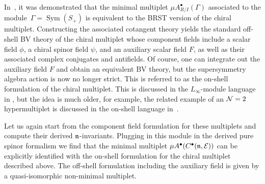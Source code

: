 \documentclass[pdftex]{sigma}
\numberwithin{equation}{section}
\def\cE{\mathcal E}\def\cF{\mathcal F}\def\cG{\mathcal G}\def\cH{\mathcal H}
\DeclareMathOperator{\Sym}{Sym}
\begin{document}
In~\cite{perspectives}, it was demonstrated that the minimal multiplet $\mu A^\bullet_{R/I}(\Gamma)$ associated to the module~$\Gamma = \Sym(S_+)$ is equivalent to the BRST version of the chiral multiplet. Constructing the associated cotangent theory yields the standard off-shell BV theory of the chiral multiplet whose component fields include a scalar field $\phi$, a chiral spinor field $\psi$, and an auxiliary scalar field $F$, as well as their associated complex conjugates and antifields. Of course, one can integrate out the auxiliary field $F$ and obtain an equivalent BV theory, but the supersymmetry algebra action is now no longer strict. This is referred to as the on-shell formulation of the chiral multiplet. This is discussed in the $L_\infty$-module language in \cite{SWchar}, but the idea is much older, for example, the related example of an $\mathcal N=2$ hypermultiplet is discussed in the on-shell language in~\cite{BaulieuSusy}.

Let us again start from the component field formulation for these multiplets and compute their derived $\mathfrak n$-invariants. Plugging in this module in the derived pure spinor formalism we find that the minimal multiplet $\mu A^\bullet(C^\bullet(\fn,\cE))$ can be explicitly identified with the on-shell formulation for the chiral multiplet described above. The off-shell formulation including the auxiliary field is given by a quasi-isomorphic non-minimal multiplet.
\end{document}
